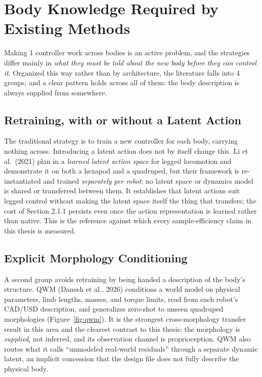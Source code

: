\documentclass[12pt,a4paper,oneside]{report}
\begin{document}
\section{Body Knowledge Required by Existing Methods}
Making 1 controller work across bodies is an active problem, and the strategies differ mainly in
\emph{what they must be told about the new body before they can control it}. Organized this way rather
than by architecture, the literature falls into 4 groups, and a clear pattern holds across all of
them: the body description is always supplied from somewhere.

\subsection{Retraining, with or without a Latent Action}
The traditional strategy is to train a new controller for each body, carrying nothing across. 
Introducing a latent action does not by itself change this. Li et al.\ (2021) plan in a
\emph{learned latent action space} for legged locomotion and demonstrate it on both a hexapod and a
quadruped, but their framework is re-instantiated and trained \emph{separately per robot}: no latent
space or dynamics model is shared or transferred between them. It establishes that latent actions
suit legged control without making the latent space itself the thing that transfers; the cost of
Section 2.1.1 persists even once the action representation is learned rather than native. This is the
reference against which every sample-efficiency claim in this thesis is measured.

\subsection{Explicit Morphology Conditioning}
A second group avoids retraining by being handed a description of the body's structure. QWM
(Danesh et al., 2026) conditions a world model on physical parameters, limb lengths, masses, and torque
limits, read from each robot's CAD/USD description, and generalizes zero-shot to unseen quadruped
morphologies (Figure~\ref{fig:qwm}). It is the strongest cross-morphology transfer result in this
area and the clearest contrast to this thesis: the morphology is \emph{supplied}, not inferred, and
its observation channel is proprioception. QWM also routes what it calls ``unmodeled real-world
residuals'' through a separate dynamic latent, an implicit concession that the design file does not
fully describe the physical body.
\end{document}
